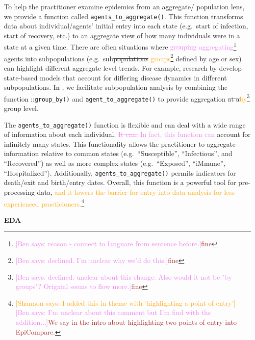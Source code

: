 \documentclass[
  shortnames]{jss}
\begin{document}
To help the practitioner examine epidemics from an aggregate/ population
lens, we provide a function called \texttt{agents\_to\_aggregate()}.
This function transforms data about individual/agents' initial entry
into each state (e.g.~start of infection, start of recovery, etc.) to an
aggregate view of how many individuals were in a state at a given time.
There are often situations where
\textcolor{violet}{\sout{grouping} aggregating}\footnote{\textcolor{violet}{[Ben says: reason - connect to languare from sentence before.]}\textcolor{brown}{fine}}
agents into subpopulations
(e.g.~sub\sout{populations}\textcolor{orange}{ groups}\footnote{\textcolor{violet}{[Ben says: declined. I'm unclear why we'd do this.]}\textcolor{brown}{fine}}
defined by age or sex) can highlight different aggregate level trends.
For example, research by \citet{rvachev1985,anderson1992,worby2015}
develop state-based models that account for differing disease dynamics
in different subpopulations. In , we facilitate
subpopulation analysis by combining the function
::\texttt{group\_by()} and \texttt{agent\_to\_aggregate()} to
provide aggregation
\sout{at a}\textcolor{orange}{by}\footnote{\textcolor{violet}{[Ben says: declined. unclear about this change. Also would it not be "by groups"? Orignial seems to flow more.]}\textcolor{brown}{fine}}
group level.

The \texttt{agents\_to\_aggregate()} function is flexible and can deal
with a wide range of information about each individual.
\textcolor{violet}{\sout{It can,} In fact, this function can} account
for infinitely many states. This functionality allows the practitioner
to aggregate information relative to common states
(e.g.~``Susceptible'', ``Infectious'', and ``Recovered'') as well as
more complex states (e.g.~``Exposed'', ``iMmune'', ``Hospitalized'').
Additionally, \texttt{agents\_to\_aggregate()} permits indicators for
death/exit and birth/entry dates. Overall, this function is a powerful
tool for pre-processing data,
\textcolor{orange}{and it lowers the barrier for entry into data analysis for less experienced practicioners.}\footnote{\textcolor{orange}{[Shannon says: I added this in theme with 'highlighting a point of entry']} \textcolor{violet}{[Ben says: I'm unclear about this comment but I'm find with the addition...]}\textcolor{brown}{We say in the intro about highlighting two points of entry into EpiCompare.}}

\textbf{EDA}
\end{document}
